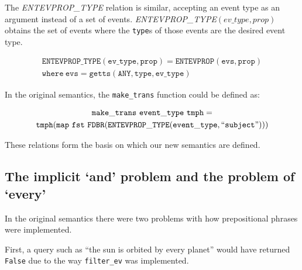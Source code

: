 \documentclass[../main.tex]{subfiles}
\begin{document}
The {\em ENTEVPROP\_TYPE} relation is similar, accepting an event type as an argument instead of a set of events.
{\em ENTEVPROP\_TYPE}$(ev\_type, prop)$ obtains the set of events where the \texttt{type}s of those events are the desired event type.


\begin{definition}
	\begin{multline*}
	\mathtt{ENTEVPROP\_TYPE}(\mathtt{ev\_type}, \mathtt{prop}) = \mathtt{ENTEVPROP}(\mathtt{evs}, \mathtt{prop}) \\ \mathtt{where} \ \mathtt{evs} = \mathtt{getts}(\mathtt{ANY}, \mathtt{type}, \mathtt{ev\_type})
	\end{multline*}
\end{definition}

In the original semantics, the \texttt{make\_trans} function could be defined as:

\begin{multline*}
  \mathtt{make\_trans} \ \mathtt{event\_type}\ \mathtt{tmph} = \\ \mathtt{tmph} (\mathtt{map} \ \mathtt{fst}\ \mathtt{FDBR}(\mathtt{ENTEVPROP\_TYPE}(\mathtt{event\_type}, \text{``\texttt{subject}''})))
\end{multline*}

These relations form the basis on which our new semantics are defined.

\subsection{The implicit `and' problem and the problem of `every'}

In the original semantics there were two problems with how prepositional phrases were implemented.

First, a query such as ``the sun is orbited by every planet'' would have returned \texttt{False} due to the way \texttt{filter\_ev} was implemented.
\end{document}
